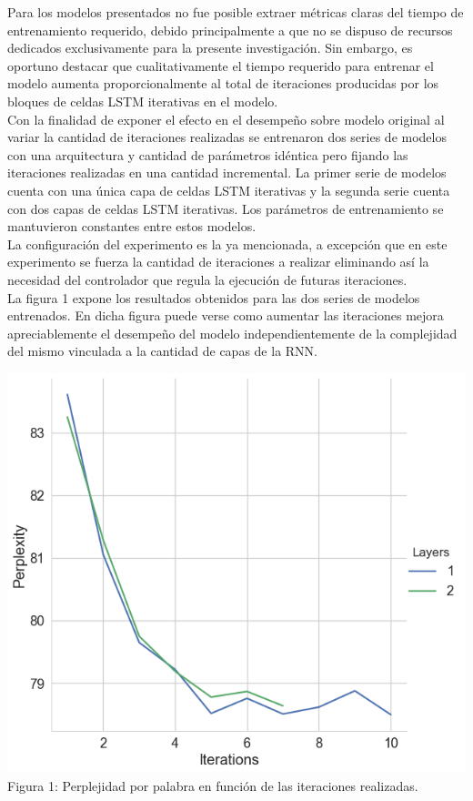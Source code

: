 \documentclass{article}
\begin{document}
	Para los modelos presentados no fue posible extraer métricas claras del tiempo de entrenamiento requerido, debido principalmente a que no se dispuso de recursos dedicados exclusivamente para la presente investigación. Sin embargo, es oportuno destacar que cualitativamente el tiempo requerido para entrenar el modelo aumenta proporcionalmente al total de iteraciones producidas por los bloques de celdas LSTM iterativas en el modelo.\\
	
	Con la finalidad de exponer el efecto en el desempeño sobre modelo original al variar la cantidad de iteraciones realizadas se entrenaron dos series de modelos con una arquitectura y cantidad de parámetros idéntica pero fijando las iteraciones realizadas en una cantidad incremental. La primer serie de modelos cuenta con una única capa de celdas LSTM iterativas y la segunda serie cuenta con dos capas de celdas LSTM iterativas. Los parámetros de entrenamiento se mantuvieron constantes entre estos modelos.\\
	La configuración del experimento es la ya mencionada, a excepción que en este experimento se fuerza la cantidad de iteraciones a realizar eliminando así la necesidad del controlador que regula la ejecución de futuras iteraciones.\\
	La figura 1 expone los resultados obtenidos para las dos series de modelos entrenados. En dicha figura puede verse como aumentar las iteraciones mejora apreciablemente el desempeño del modelo independientemente de la complejidad del mismo vinculada a la cantidad de capas de la RNN.
	\begin{center}
		\includegraphics[scale=0.4]{pplVsIterations.png}
		\label{pplVsIterationsFigure}\\
		Figura 1: Perplejidad por palabra en función de las iteraciones realizadas.
	\end{center}
	
\end{document}
